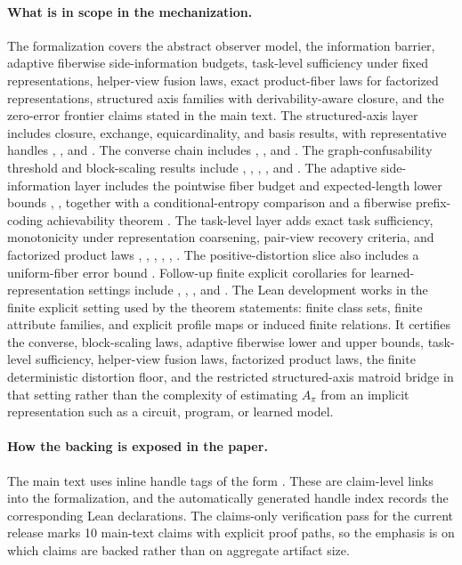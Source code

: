 \paragraph{What is in scope in the mechanization.}
The formalization covers the abstract observer model, the information barrier, adaptive fiberwise side-information budgets, task-level sufficiency under fixed representations, helper-view fusion laws, exact product-fiber laws for factorized representations, structured axis families with derivability-aware closure, and the zero-error frontier claims stated in the main text. The structured-axis layer includes closure, exchange, equicardinality, and basis results, with representative handles , , and . The converse chain includes , , and . The graph-confusability threshold and block-scaling results include , , , , and . The adaptive side-information layer includes the pointwise fiber budget and expected-length lower bounds , , together with a conditional-entropy comparison  and a fiberwise prefix-coding achievability theorem . The task-level layer adds exact task sufficiency, monotonicity under representation coarsening, pair-view recovery criteria, and factorized product laws , , , , , . The positive-distortion slice also includes a uniform-fiber error bound . Follow-up finite explicit corollaries for learned-representation settings include , , , and . The Lean development works in the finite explicit setting used by the theorem statements: finite class sets, finite attribute families, and explicit profile maps or induced finite relations. It certifies the converse, block-scaling laws, adaptive fiberwise lower and upper bounds, task-level sufficiency, helper-view fusion laws, factorized product laws, the finite deterministic distortion floor, and the restricted structured-axis matroid bridge in that setting rather than the complexity of estimating $A_\pi$ from an implicit representation such as a circuit, program, or learned model.

\paragraph{How the backing is exposed in the paper.}
The main text uses inline handle tags of the form . These are claim-level links into the formalization, and the automatically generated handle index records the corresponding Lean declarations. The claims-only verification pass for the current release marks 10 main-text claims with explicit proof paths, so the emphasis is on which claims are backed rather than on aggregate artifact size.

